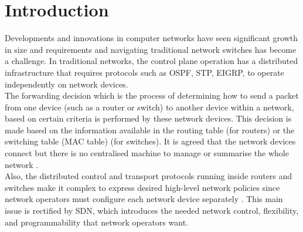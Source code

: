 \documentclass{article}
\begin{document}
\section{Introduction}
Developments and innovations in computer networks have seen significant growth in size and requirements and navigating traditional network switches has become a challenge. In traditional networks, the control plane operation has a distributed infrastructure that requires protocols such as OSPF, STP, EIGRP, to operate independently on network devices. \\ The forwarding decision which is the process of determining how to send a packet from one device (such as a router or switch) to another device within a network, based on certain criteria is performed by these network devices. This decision is made based on the information available in the routing table (for routers) or the switching table (MAC table) (for switches). It is agreed that the network devices connect but there is no centralised machine to manage or summarise the whole network \citep{Haji_Zeebaree_Saeed_Ameen_Shukur_Omar_Sadeeq_Ageed_Ibrahim_Yasin_2021}. \\ Also, the distributed control and transport protocols running inside routers and switches make it complex to express desired high-level network policies since network operators must configure each network device separately \citep{6994333}. This main issue is rectified by SDN, which introduces the needed network control, flexibility, and programmability that network operators want.
\end{document}
